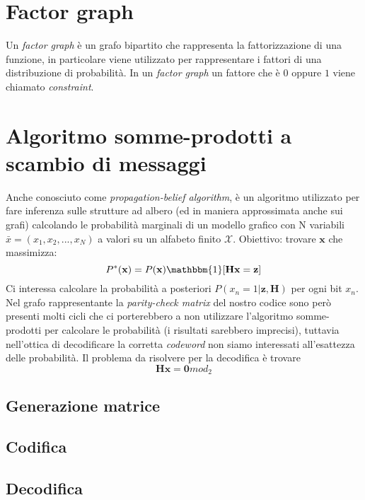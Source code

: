 \documentclass{article}
\begin{document}
	\section{Factor graph}
		Un \textit{factor graph} è un grafo bipartito che rappresenta la fattorizzazione di una funzione, in particolare viene utilizzato per rappresentare i fattori di una distribuzione di probabilità. In un \textit{factor graph} un fattore che è $0$ oppure $1$ viene chiamato \textit{constraint}.


	\section{Algoritmo somme-prodotti a scambio di messaggi}
Anche conosciuto come \textit{propagation-belief algorithm}, è un algoritmo utilizzato per fare inferenza sulle strutture ad albero (ed in maniera approssimata anche sui grafi) calcolando le probabilità marginali di un modello grafico con N variabili $\bar{x} = (x_1,x_2, ..., x_N)$ a valori su un alfabeto finito $\mathcal{X}$.
Obiettivo: trovare $\textbf{x}$ che massimizza:
\begin{equation} 
	P^*(\textbf{x})=P(\textbf{x})\mathbbm{1}[\textbf{Hx} = \textbf{z}]
\end{equation}
Ci interessa calcolare la probabilità a posteriori $P(x_n = 1 | \textbf{z}, \textbf{H})$ per ogni bit $x_n$. Nel grafo rappresentante la \textit{parity-check matrix} del nostro codice sono però presenti molti cicli che ci porterebbero a non utilizzare l'algoritmo somme-prodotti per calcolare le probabilità (i risultati sarebbero imprecisi), tuttavia nell'ottica di decodificare la corretta \textit{codeword} non siamo interessati all'esattezza delle probabilità. Il problema da risolvere per la decodifica è trovare 
\begin{equation}
\textbf{Hx} = \textbf{0}  mod_2
\end{equation}
	\subsection{Generazione matrice}
	
	\subsection{Codifica}
	
	\subsection{Decodifica}
\end{document}
